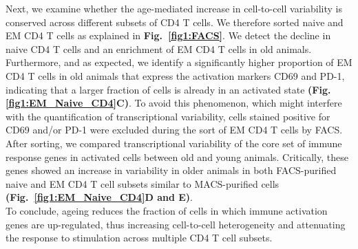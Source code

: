 Next, we examine whether the age-mediated increase in cell-to-cell variability is conserved across different subsets of CD4\plus{} T cells. 
We therefore sorted naive and EM CD4\plus{} T cells as explained in \textbf{Fig.~\ref{fig1:FACS}}. 
We detect the decline in naive CD4\plus{} T cells and an enrichment of EM CD4\plus{} T cells in old animals. 
Furthermore, and as expected, we identify a significantly higher proportion of EM CD4\plus{} T cells in old animals that express the activation markers CD69 and PD-1, indicating that a larger fraction of cells is already in an activated state \textbf{(Fig. \ref{fig1:EM_Naive_CD4}C)}. 
To avoid this phenomenon, which might interfere with the quantification of transcriptional variability, cells stained positive for CD69 and/or PD-1 were excluded during the sort of EM CD4\plus{} T cells by FACS. 
After sorting, we compared transcriptional variability of the core set of immune response genes in activated cells between old and young animals. 
Critically, these genes showed an increase in variability in older animals in both FACS-purified naive and EM CD4\plus{} T cell subsets similar to MACS-purified cells  \textbf{(Fig.~\ref{fig1:EM_Naive_CD4}D and E)}.\\

To conclude, ageing reduces the fraction of cells in which immune activation genes are up-regulated, thus increasing cell-to-cell heterogeneity and attenuating the response to stimulation across multiple CD4\plus{} T cell subsets.

\newpage

